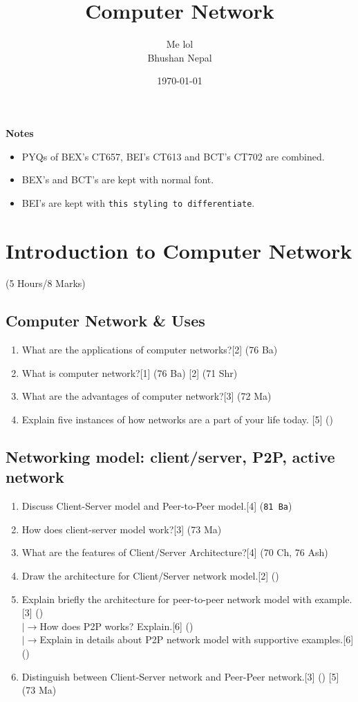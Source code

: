 \documentclass[12pt]{article}
\title{Computer Network}
\author{Me lol\\Bhushan Nepal}
\date{\today}
\newcommand{\lb}{\\$\left|\rightarrow\right.$}
\begin{document}
\maketitle
\vspace{13cm}
\begin{large}\textbf{Notes}\end{large}
\begin{itemize}
\item PYQs of BEX's CT657, BEI's CT613 and BCT's CT702 are combined.
\item BEX's and BCT's are kept with normal font.\item BEI's are kept with \texttt{this styling to differentiate}.
\end{itemize}
\pagebreak
\tableofcontents
\pagebreak

\section{Introduction to Computer Network}
	\begin{center}(5 Hours/8 Marks)\end{center}
	\subsection{Computer Network \& Uses}
		\begin{enumerate}[noitemsep, topsep = 0pt]
			\item What are the applications of computer networks?\hfill[2] (76 Ba)
			\item What is computer network?\hfill[1] (76 Ba) [2] (71 Shr)
			\item What are the advantages of computer network?\hfill[3] (72 Ma)
			\item Explain five instances of how networks are a part of your life today. \hfill [5] ()
		\end{enumerate}

	\subsection{Networking model: client/server, P2P, active network}
		\begin{enumerate}[noitemsep, topsep = 0pt]
			\item Discuss Client-Server model and Peer-to-Peer model.\hfill[4] (\texttt{81 Ba})
			\item How does client-server model work?\hfill[3] (73 Ma)
			\item What are the features of Client/Server Architecture?\hfill[4] (70 Ch, 76 Ash)
			\item Draw the architecture for Client/Server network model.\hfill[2] ()
			\item Explain briefly the architecture for peer-to-peer network model with example.\hfill[3] ()
			\lb How does P2P works? Explain.\hfill[6] ()
			\lb Explain in details about P2P network model with supportive examples.\hfill[6] ()
			\item Distinguish between Client-Server network and Peer-Peer network.\hfill[3] () [5] (73 Ma)
		\end{enumerate}
\end{document}

